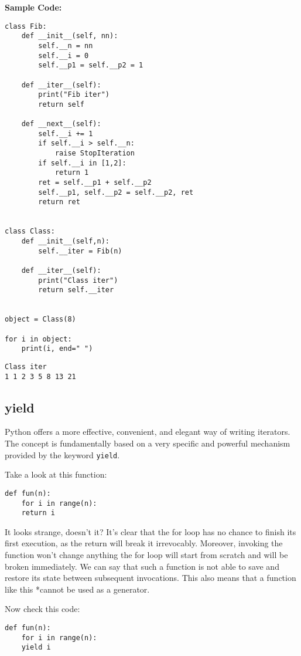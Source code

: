 \documentclass[11pt]{article}
\begin{document}
\textbf{Sample Code:}

\begin{verbatim}
class Fib:
	def __init__(self, nn):
		self.__n = nn
		self.__i = 0
		self.__p1 = self.__p2 = 1

	def __iter__(self):
		print("Fib iter")
		return self

	def __next__(self):
		self.__i += 1
		if self.__i > self.__n:
			raise StopIteration
		if self.__i in [1,2]:
			return 1
		ret = self.__p1 + self.__p2
		self.__p1, self.__p2 = self.__p2, ret
		return ret


class Class:
	def __init__(self,n):
		self.__iter = Fib(n)

	def __iter__(self):
		print("Class iter")
		return self.__iter


object = Class(8)

for i in object:
	print(i, end=" ")

\end{verbatim}

\begin{verbatim}
Class iter
1 1 2 3 5 8 13 21 
\end{verbatim}

\subsection{yield}
\label{sec:org27b5e3f}
Python offers a more effective, convenient, and elegant way of writing
iterators. The concept is fundamentally based on a very specific and
powerful mechanism provided by the keyword \texttt{yield}. 

Take a look at this function:

\begin{verbatim}
def fun(n):
    for i in range(n):
	return i
\end{verbatim}

It looks strange, doesn’t it? It’s clear that the for loop has no
chance to finish its first execution, as the return will break it
irrevocably. Moreover, invoking the function won’t change anything the
for loop will start from scratch and will be broken immediately. We
can say that such a function is not able to save and restore its state
between subsequent invocations. This also means that a function like
this *cannot be used as a generator.

Now check this code:

\begin{verbatim}
def fun(n):
    for i in range(n):
	yield i
\end{verbatim}
\end{document}
